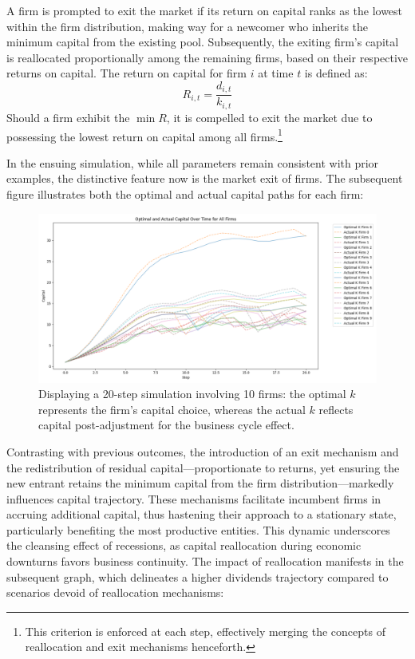 \documentclass[12pt]{report}
\begin{document}
A firm is prompted to exit the market if its return on capital ranks as the lowest within the firm distribution, making
way for a newcomer who inherits the minimum capital from the existing pool. Subsequently, the exiting firm's capital is
reallocated proportionally among the remaining firms, based on their respective returns on capital. The return on
capital for firm \( i \) at time \( t \) is defined as: 
\[
R_{i,t} = \frac{d_{i,t}}{k_{i,t}}
\]
Should a firm exhibit the \( \min{R} \), it is compelled to exit the market due to possessing the lowest return on capital
among all firms.\footnote{This criterion is enforced at each step, effectively merging the concepts of reallocation and
exit mechanisms henceforth.} 

In the ensuing simulation, while all parameters remain consistent with prior examples, the distinctive feature now is
the market exit of firms. The subsequent figure illustrates both the optimal and actual capital paths for each firm: 

\begin{figure}[H]
    \centering
    \includegraphics[scale=0.4]{figure/OptimalK_exit.png}
    \caption{Displaying a 20-step simulation involving 10 firms: the optimal \( k \) represents the firm's capital choice,
    whereas the actual \( k \) reflects capital post-adjustment for the business cycle
     effect.}
    \label{fig:optKE}
\end{figure}

Contrasting with previous outcomes, the introduction of an exit mechanism and the redistribution of residual
capital—proportionate to returns, yet ensuring the new entrant retains the minimum capital from the firm
distribution—markedly influences capital trajectory. These mechanisms facilitate incumbent firms in accruing additional
capital, thus hastening their approach to a stationary state, particularly benefiting the most productive entities. This
dynamic underscores the cleansing effect of recessions, as capital reallocation during economic downturns favors
business continuity. The impact of reallocation manifests in the subsequent graph, which delineates a higher
dividends trajectory compared to scenarios devoid of reallocation mechanisms: 
\end{document}
